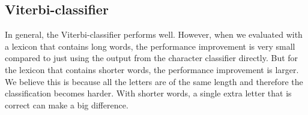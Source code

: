 \subsection{Viterbi-classifier}
In general, the Viterbi-classifier performs well.
However, when we evaluated with a lexicon that contains long words, the performance improvement is very small compared to just using the output from the character classifier directly.
But for the lexicon that contains shorter words, the performance improvement is larger. 
We believe this is because all the letters are of the same length and therefore the classification becomes harder.
With shorter words, a single extra letter that is correct can make a big difference.
